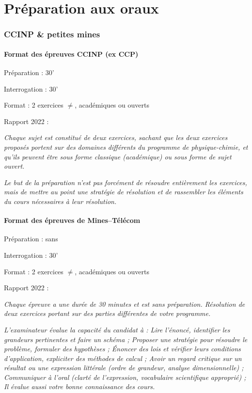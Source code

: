 \setcounter{part}{34}    %

\part{Préparation aux oraux} %

\section{CCINP \& petites mines}

\subsection{Format des épreuves CCINP (ex CCP)}

\textsf{Préparation :} 30'

\textsf{Interrogation :} 30'

\textsf{Format :} 2 exercices $\neq$, académiques ou ouverts

\textsf{Rapport 2022 :}

\textsl{Chaque sujet est constitué de deux exercices, sachant que les deux exercices proposés portent sur des
domaines différents du programme de physique-chimie, et qu'ils peuvent être sous forme classique
(académique) ou sous forme de sujet ouvert.}

\textsl{Le but de la préparation n'est pas forcément de résoudre entièrement les exercices, mais de mettre
au point une stratégie de résolution et de rassembler les éléments du cours nécessaires à leur
résolution.}


\subsection{Format des épreuves de Mines--Télécom}

\textsf{Préparation :} sans

\textsf{Interrogation :} 30'

\textsf{Format :} 2 exercices $\neq$, académiques ou ouverts

\textsf{Rapport 2022 :}

\textsl{Chaque épreuve a une durée de 30 minutes et est sans préparation. Résolution de deux exercices portant sur des parties différentes de votre programme.}

\textsl{L’examinateur évalue la capacité du candidat à : 
    Lire l’énoncé, identifier les grandeurs pertinentes et faire un schéma ;
    Proposer une stratégie pour résoudre le problème, formuler des hypothèses ; 
    Énoncer des lois et vérifier leurs conditions d’application, expliciter des méthodes de calcul ;
    Avoir un regard critique sur un résultat ou une expression littérale (ordre de grandeur, analyse dimensionnelle) ;
    Communiquer à l’oral (clarté de l’expression, vocabulaire scientifique approprié) ;
    Il évalue aussi votre bonne connaissance des cours.
}

